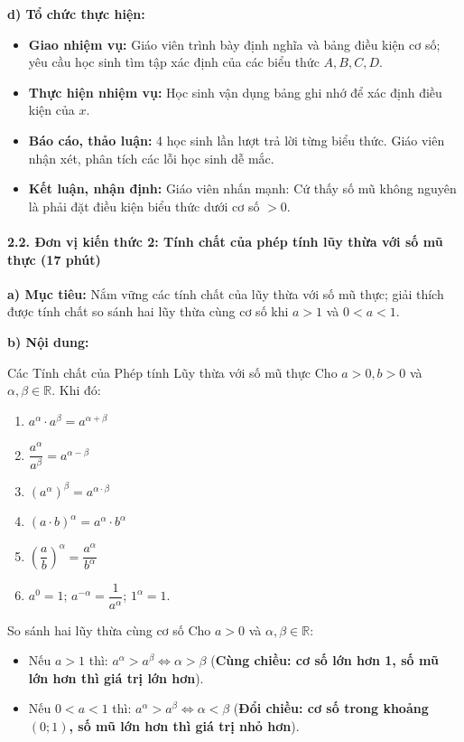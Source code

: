\documentclass[12pt, a4paper]{article}
\begin{document}
\noindent \textbf{d) Tổ chức thực hiện:}
\begin{itemize}[leftmargin=0.6cm]
    \item \textbf{Giao nhiệm vụ:} Giáo viên trình bày định nghĩa và bảng điều kiện cơ số; yêu cầu học sinh tìm tập xác định của các biểu thức $A, B, C, D$.
    \item \textbf{Thực hiện nhiệm vụ:} Học sinh vận dụng bảng ghi nhớ để xác định điều kiện của $x$.
    \item \textbf{Báo cáo, thảo luận:} 4 học sinh lần lượt trả lời từng biểu thức. Giáo viên nhận xét, phân tích các lỗi học sinh dễ mắc.
    \item \textbf{Kết luận, nhận định:} Giáo viên nhấn mạnh: Cứ thấy số mũ không nguyên là phải đặt điều kiện biểu thức dưới cơ số $> 0$.
\end{itemize}

\paragraph{2.2. Đơn vị kiến thức 2: Tính chất của phép tính lũy thừa với số mũ thực (17 phút)}

\noindent \textbf{a) Mục tiêu:}
Nắm vững các tính chất của lũy thừa với số mũ thực; giải thích được tính chất so sánh hai lũy thừa cùng cơ số khi $a > 1$ và $0 < a < 1$.

\noindent \textbf{b) Nội dung:}
\begin{pedabox}{Các Tính chất của Phép tính Lũy thừa với số mũ thực}
Cho $a > 0, b > 0$ và $\alpha, \beta \in \mathbb{R}$. Khi đó:
\begin{enumerate}[leftmargin=0.6cm]
    \item $a^\alpha \cdot a^\beta = a^{\alpha + \beta}$
    \item $\dfrac{a^\alpha}{a^\beta} = a^{\alpha - \beta}$
    \item $(a^\alpha)^\beta = a^{\alpha \cdot \beta}$
    \item $(a \cdot b)^\alpha = a^\alpha \cdot b^\alpha$
    \item $\left(\dfrac{a}{b}\right)^\alpha = \dfrac{a^\alpha}{b^\alpha}$
    \item $a^0 = 1$; \quad $a^{-\alpha} = \dfrac{1}{a^\alpha}$; \quad $1^\alpha = 1$.
\end{enumerate}
\end{pedabox}

\begin{pedabox}{So sánh hai lũy thừa cùng cơ số}
Cho $a > 0$ và $\alpha, \beta \in \mathbb{R}$:
\begin{itemize}[leftmargin=0.6cm]
    \item Nếu $a > 1$ thì: $a^\alpha > a^\beta \iff \alpha > \beta$ (\textbf{Cùng chiều: cơ số lớn hơn 1, số mũ lớn hơn thì giá trị lớn hơn}).
    \item Nếu $0 < a < 1$ thì: $a^\alpha > a^\beta \iff \alpha < \beta$ (\textbf{Đổi chiều: cơ số trong khoảng $(0; 1)$, số mũ lớn hơn thì giá trị nhỏ hơn}).
\end{itemize}
\end{pedabox}
\end{document}
